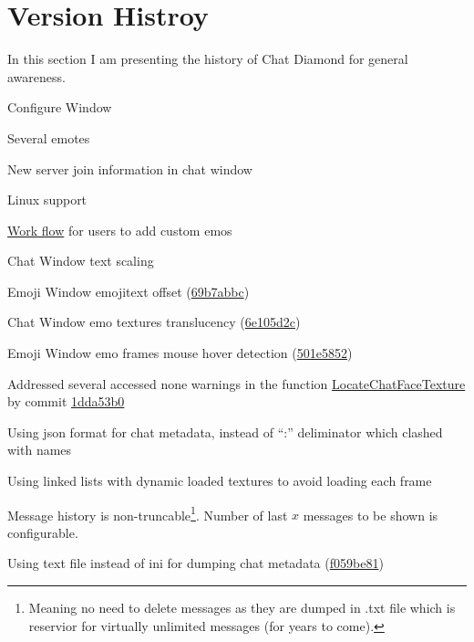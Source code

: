 \documentclass{article}
\theoremstyle{definition}
\begin{document}
\section{Version Histroy}
In this section I am presenting the history of Chat Diamond for general awareness.
\begin{changelog}[author=The\_Cowboy, sectioncmd=\section*]
\begin{version}[v=0.8, date=2023-xx-xx]
  \added
    \item Configure Window
    \item Several emotes
    \item New server join information in chat window
    \item Linux support
    \item \href{https://github.com/ravimohan1991/ChatDiamond/wiki/Adding-an-Emote-in-Chat-Diamond}{Work flow} for users to add custom emos
  \fixed
    \item Chat Window text scaling
    \item Emoji Window emojitext offset (\href{https://github.com/ravimohan1991/ChatDiamond/commit/69b7abbce0617ae1c2de0660379984852df9c76d}{69b7abbc})
    \item Chat Window emo textures translucency (\href{https://github.com/ravimohan1991/ChatDiamond/commit/6e105d2cce5db1380c27df546e604d0f306eccd4}{6e105d2c})
    \item Emoji Window emo frames mouse hover detection (\href{https://github.com/ravimohan1991/ChatDiamond/commit/501e585250a6553ca95ca9b9d5e0ad25b1e645b5}{501e5852})
    \item Addressed several accessed none warnings in the function \href{https://github.com/ravimohan1991/ChatDiamond/blob/1dda53b01b493a2ef8be156966b3230758211254/Classes/CDUTChatTextTextureAnimEmoteArea.uc#L890}{LocateChatFaceTexture} by commit \href{https://github.com/ravimohan1991/ChatDiamond/commit/1dda53b01b493a2ef8be156966b3230758211254}{1dda53b0}
 \changed
    \item Using json format for chat metadata, instead of ``:'' deliminator which clashed with names
    \item Using linked lists with dynamic loaded textures to avoid loading each frame
    \item Message history is non-truncable\footnote{Meaning no need to delete messages as they are dumped in .txt file which is reservior for virtually unlimited messages (for years to come).}. Number of last $x$ messages to be shown is configurable.
    \item Using text file instead of ini for dumping chat metadata (\href{https://github.com/ravimohan1991/ChatDiamond/commit/f059be817532fa720804bd20f54a36e3c82ddb9d}{f059be81})
\end{version}
\end{changelog}
\end{document}
